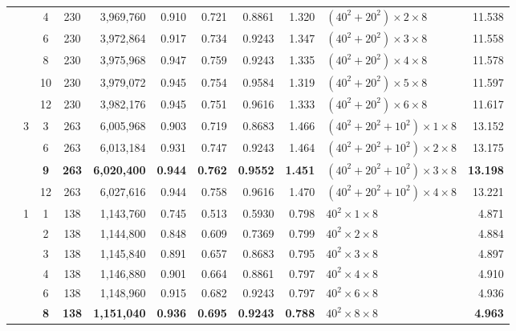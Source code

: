 \documentclass[journal,twoside,web]{ieeecolor}
\begin{document}
\begin{table}[!t]
{\begin{tabular}{l c c c r r r r r l r}
         & & 4 & 230 & 3,969,760 & 0.910 & 0.721 & 0.8861 & 1.320 & $(40^2+20^2) \times 2 \times 8$ & 11.538 \\
         & & 6 & 230 & 3,972,864 & 0.917 & 0.734 & 0.9243 & 1.347 & $(40^2+20^2) \times 3 \times 8$ & 11.558 \\
         & & 8 & 230 & 3,975,968 & 0.947 & 0.759 & 0.9243 & 1.335 & $(40^2+20^2) \times 4 \times 8$ & 11.578 \\
         & & 10 & 230 & 3,979,072 & 0.945 & 0.754 & 0.9584 & 1.319 & $(40^2+20^2) \times 5 \times 8$ & 11.597 \\
         & & 12 & 230 & 3,982,176 & 0.945 & 0.751 & 0.9616 & 1.333 & $(40^2+20^2) \times 6 \times 8$ & 11.617 \\
        \cmidrule(r){2-11} %
         &  & 3 & 263 & 6,005,968 & 0.903 & 0.719 & 0.8683 & 1.466 & $(40^2+20^2+10^2) \times 1 \times 8$ & 13.152 \\
         & & 6 & 263 & 6,013,184 & 0.931 & 0.747 & 0.9243 & 1.464 & $(40^2+20^2+10^2) \times 2 \times 8$ & 13.175 \\
         & & \textbf{9} & \textbf{263} & \textbf{6,020,400} & \textbf{0.944} & \textbf{0.762} & \textbf{0.9552} & \textbf{1.451} & $(40^2+20^2+10^2) \times 3 \times 8$ & \textbf{13.198} \\
         & & 12 & 263 & 6,027,616 & 0.944 & 0.758 & 0.9616 & 1.470 & $(40^2+20^2+10^2) \times 4 \times 8$ & 13.221 \\
        \midrule
         &  & 1 & 138 & 1,143,760 & 0.745 & 0.513 & 0.5930 & 0.798 & $40^2 \times 1 \times 8$ & 4.871 \\
         & & 2 & 138 & 1,144,800 & 0.848 & 0.609 & 0.7369 & 0.799 & $40^2 \times 2 \times 8$ & 4.884 \\
         & & 3 & 138 & 1,145,840 & 0.891 & 0.657 & 0.8683 & 0.795 & $40^2 \times 3 \times 8$ & 4.897 \\
         & & 4 & 138 & 1,146,880 & 0.901 & 0.664 & 0.8861 & 0.797 & $40^2 \times 4 \times 8$ & 4.910 \\
         & & 6 & 138 & 1,148,960 & 0.915 & 0.682 & 0.9243 & 0.797 & $40^2 \times 6 \times 8$ & 4.936 \\
         & & \textbf{8} & \textbf{138} & \textbf{1,151,040} & \textbf{0.936} & \textbf{0.695} & \textbf{0.9243} & \textbf{0.788} & $40^2 \times 8 \times 8$ & \textbf{4.963} \\

\end{tabular}}
\end{table}
\end{document}

